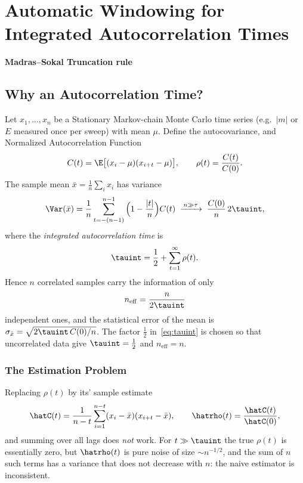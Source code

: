 \documentclass[a4paper, 10pt, onepage]{elegantbook}
\begin{document}
{\chapter{Automatic Windowing for Integrated Autocorrelation Times}
\textbf{Madras--Sokal Truncation rule}

\section{Why an Autocorrelation Time?}

Let $x_1,\dots,x_n$ be a Stationary Markov-chain Monte Carlo time series
(e.g.\ $|m|$ or $E$ measured once per sweep) with mean $\mu$.
Define the autocovariance, and Normalized Autocorrelation Function
\begin{equation}
  C(t)=\E\big[(x_i-\mu)(x_{i+t}-\mu)\big],\qquad
  \rho(t)=\frac{C(t)}{C(0)} .
\end{equation}
The sample mean $\bar x=\frac1n\sum_i x_i$ has variance
\begin{equation}
  \Var(\bar x)=\frac{1}{n}\sum_{t=-(n-1)}^{n-1}\Big(1-\frac{|t|}{n}\Big)C(t)
  \;\xrightarrow{\,n\gg\tau\,}\;
  \frac{C(0)}{n}\,2\tauint,
\end{equation}
where the \emph{integrated autocorrelation time} is
\begin{equation}
  \tauint=\frac12+\sum_{t=1}^{\infty}\rho(t).
  \label{eq:tauint}
\end{equation}
Hence $n$ correlated samples carry the information of only
\begin{equation}
  n_{\mathrm{eff}}=\frac{n}{2\tauint}
\end{equation}
independent ones, and the statistical error of the mean is
$\sigma_{\bar x}=\sqrt{2\tauint\,C(0)/n}$.
The factor $\tfrac12$ in~\eqref{eq:tauint} is chosen so that
uncorrelated data give $\tauint=\tfrac12$ and $n_{\mathrm{eff}}=n$.

\subsection{The Estimation Problem}

Replacing $\rho(t)$ by its' sample estimate
\begin{equation}
  \hatC(t)=\frac{1}{n-t}\sum_{i=1}^{n-t}(x_i-\bar x)(x_{i+t}-\bar x),
  \qquad
  \hatrho(t)=\frac{\hatC(t)}{\hatC(0)},
\end{equation}
and summing over all lags does \emph{not} work. For $t\gg\tauint$ the true
$\rho(t)$ is essentially zero, but $\hatrho(t)$ is pure noise of size
$\sim n^{-1/2}$, and the sum of $n$ such terms has a variance that does not
decrease with $n$: the naive estimator is inconsistent.

}
\end{document}
